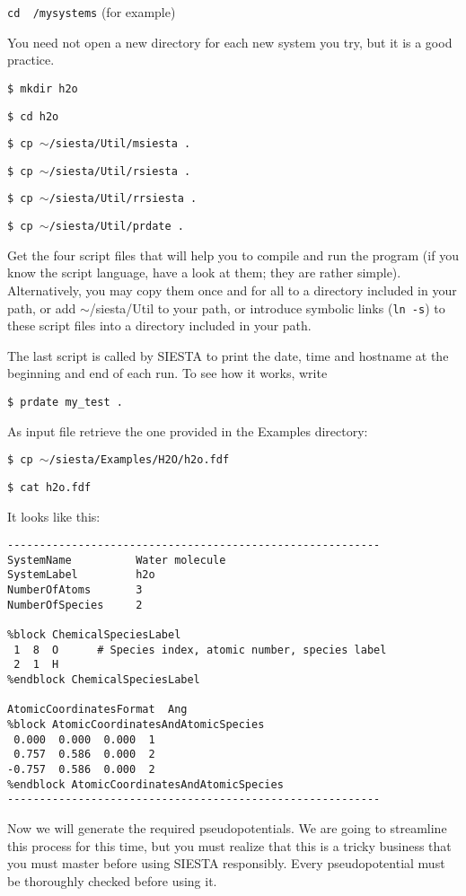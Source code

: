 {\tt cd ~/mysystems} (for example)

\noindent
You need not open a new directory
for each new system you try, but it is a good practice.

{\tt \$ mkdir h2o}

{\tt \$ cd h2o}

{\tt \$ cp $\sim$/siesta/Util/msiesta .}

{\tt \$ cp $\sim$/siesta/Util/rsiesta .}

{\tt \$ cp $\sim$/siesta/Util/rrsiesta .}

{\tt \$ cp $\sim$/siesta/Util/prdate .}

\noindent
Get the four script files that will help you to compile and
run the program (if you know the script language, have a
look at them; they are rather simple). Alternatively, you
may copy them once and for all to a directory included in 
your path, or add $\sim$/siesta/Util to your path, or introduce
symbolic links ({\tt ln -s}) to these script files into a
directory included in your path.

The last script is called by SIESTA to print the date, time
and hostname at the beginning and end of each run.
To see how it works, write

{\tt \$ prdate my\_test .}

\noindent
As input file retrieve the one provided in the Examples directory:

{\tt \$ cp $\sim$/siesta/Examples/H2O/h2o.fdf}

{\tt \$ cat h2o.fdf}

\noindent
It looks like this:
\begin{verbatim}
----------------------------------------------------------
SystemName          Water molecule
SystemLabel         h2o
NumberOfAtoms       3
NumberOfSpecies     2

%block ChemicalSpeciesLabel
 1  8  O      # Species index, atomic number, species label
 2  1  H
%endblock ChemicalSpeciesLabel

AtomicCoordinatesFormat  Ang
%block AtomicCoordinatesAndAtomicSpecies
 0.000  0.000  0.000  1
 0.757  0.586  0.000  2
-0.757  0.586  0.000  2
%endblock AtomicCoordinatesAndAtomicSpecies
----------------------------------------------------------
\end{verbatim}

Now we will generate the required pseudopotentials.
We are going to streamline this process for this time, but
you must realize that this is a tricky business that you 
must master before using SIESTA responsibly. Every 
pseudopotential must be thoroughly checked before using it.

